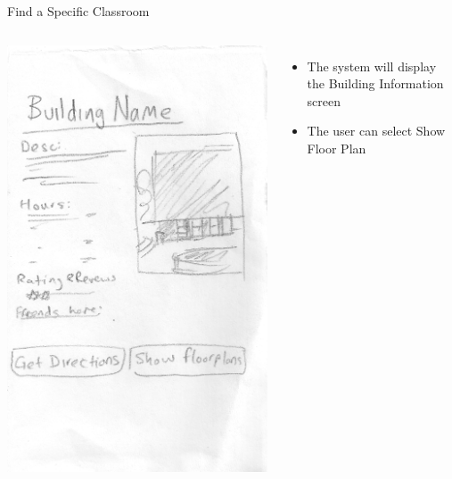 \documentclass{beamer}
\begin{document}
\begin{frame}{Find a Specific Classroom}
    \begin{columns}[c]
        \center\includegraphics[height=0.75 \textheight]{hand-drawn/buildinginfo.png}
        \begin{itemize}
            \item The system will display the Building Information screen
            \item The user can select Show Floor Plan
        \end{itemize}
    \end{columns}
\end{frame}
\end{document}

